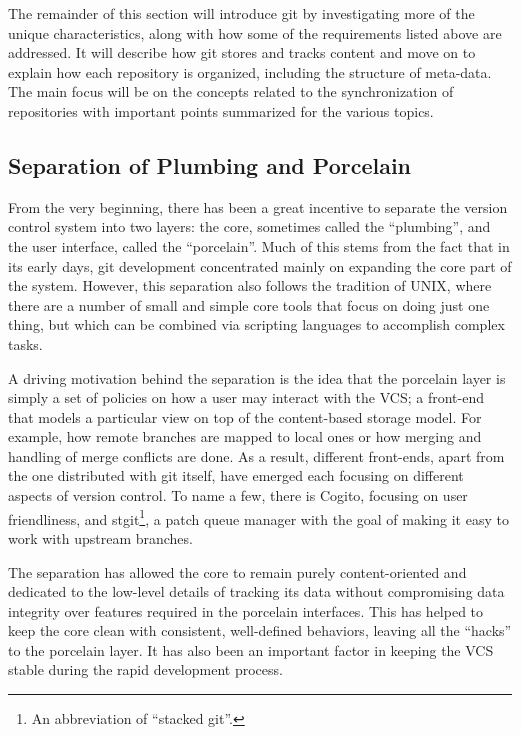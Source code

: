 The remainder of this section will introduce git by investigating more
of the unique characteristics, along with how some of the requirements
listed above are addressed. It will describe how git stores and tracks
content and move on to explain how each repository is organized,
including the structure of meta-data. The main focus will be on the
concepts related to the synchronization of repositories with important
points summarized for the various topics.

\subsection{Separation of Plumbing and Porcelain}

From the very beginning, there has been a great incentive to separate
the version control system into two layers: the core, sometimes called
the ``plumbing'', and the user interface, called the ``porcelain''.
Much of this stems from the fact that in its early days, git
development concentrated mainly on expanding the core part of the
system. However, this separation also follows the tradition of UNIX,
where there are a number of small and simple core tools that focus on
doing just one thing, but which can be combined via scripting
languages to accomplish complex tasks.

A driving motivation behind the separation is the idea that the
porcelain layer is simply a set of policies on how a user may interact
with the VCS; a front-end that models a particular view on top of the
content-based storage model. For example, how remote branches are
mapped to local ones or how merging and handling of merge conflicts
are done. As a result, different front-ends, apart from the one
distributed with git itself, have emerged each focusing on different
aspects of version control. To name a few, there is Cogito\cite{7}, focusing
on user friendliness, and stgit\cite{8}\footnote{An abbreviation of ``stacked
git''.}, a patch queue manager with the goal of making it easy to work
with upstream branches.

The separation has allowed the core to remain purely content-oriented
and dedicated to the low-level details of tracking its data without
compromising data integrity over features required in the porcelain
interfaces. This has helped to keep the core clean with consistent, well-defined behaviors,
leaving all the ``hacks'' to the porcelain layer. It has also been an
important factor in keeping the VCS stable during the rapid
development process.

